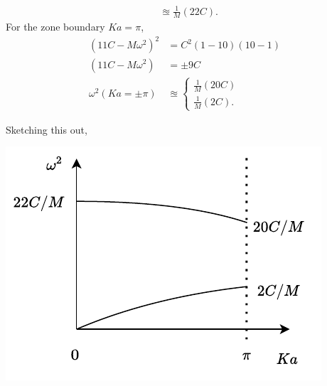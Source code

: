 \documentclass{homework}
\begin{document}
\begin{enumerate}
\begin{align*}
					& \approxeq \frac{1}{M} \left(22C\right).
			\end{align*}
			For the zone boundary $Ka = \pi$, \begin{align*}
				(11 C - M \omega^2)^2 & = C^2(1 - 10)(10 - 1)  \\
				(11 C - M \omega^2) & = \pm 9C\\
				\omega^2(Ka = \pm \pi) & \approxeq \begin{cases}
					\frac{1}{M}  \left(20C\right) \\
					\frac{1}{M} \left(2C\right).
				\end{cases}
			\end{align*}
			
			\pagebreak
			Sketching this out, 
			\begin{center}
				\includegraphics{plot.drawio.pdf}
			\end{center}

		
	\end{enumerate}
\end{document}

